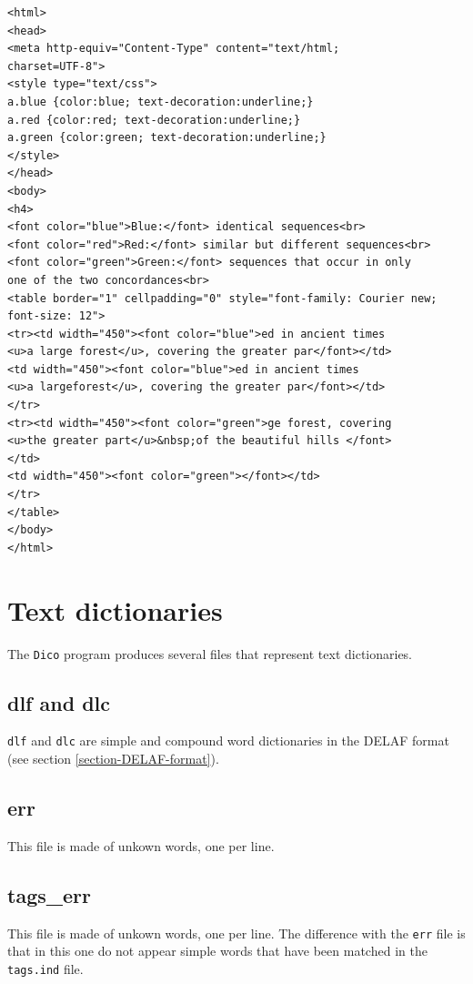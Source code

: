 \begin{verbatim}
<html>
<head>
<meta http-equiv="Content-Type" content="text/html;
charset=UTF-8">
<style type="text/css">
a.blue {color:blue; text-decoration:underline;}
a.red {color:red; text-decoration:underline;}
a.green {color:green; text-decoration:underline;}
</style>
</head>
<body>
<h4>
<font color="blue">Blue:</font> identical sequences<br>
<font color="red">Red:</font> similar but different sequences<br>
<font color="green">Green:</font> sequences that occur in only
one of the two concordances<br>
<table border="1" cellpadding="0" style="font-family: Courier new;
font-size: 12">
<tr><td width="450"><font color="blue">ed in ancient times
<u>a large forest</u>, covering the greater par</font></td>
<td width="450"><font color="blue">ed in ancient times
<u>a largeforest</u>, covering the greater par</font></td>
</tr>
<tr><td width="450"><font color="green">ge forest, covering
<u>the greater part</u>&nbsp;of the beautiful hills </font>
</td>
<td width="450"><font color="green"></font></td>
</tr>
</table>
</body>
</html>
\end{verbatim}


\section{Text dictionaries}
The \verb+Dico+ program produces several files that represent text dictionaries.

\subsection{dlf and dlc}

\verb+dlf+ and \verb+dlc+ are simple and compound word dictionaries in the DELAF
format (see section \ref{section-DELAF-format}).

\subsection{err}
This file is made of unkown words, one per line.

\subsection{tags\_err}
This file is made of unkown words, one per line. The difference with the \verb+err+ file is that 
in this one do not appear simple words that have been matched in the \verb+tags.ind+ file.


